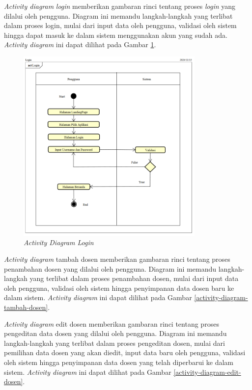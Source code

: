 \textit{Activity diagram} \textit{login} memberikan gambaran rinci tentang proses \textit{login} yang dilalui oleh pengguna. Diagram ini memandu langkah-langkah yang terlibat dalam proses login, mulai dari input data oleh pengguna, validasi oleh sistem hingga dapat masuk ke dalam sistem menggunakan akun yang sudah ada. \textit{Activity diagram} ini dapat dilihat pada Gambar \ref{activity-diagram-login}.
\begin{figure}
	\centering
	\includegraphics[width=0.82\textwidth]{konten/gambar/activity-diagram/login.png}
	\caption{\textit{Activity Diagram Login}}
	\label{activity-diagram-login}
\end{figure}

\textit{Activity diagram} tambah dosen memberikan gambaran rinci tentang proses penambahan dosen yang dilalui oleh pengguna. Diagram ini memandu langkah-langkah yang terlibat dalam proses penambahan dosen, mulai dari input data oleh pengguna, validasi oleh sistem hingga penyimpanan data dosen baru ke dalam sistem. \textit{Activity diagram} ini dapat dilihat pada Gambar \ref{activity-diagram-tambah-dosen}.



\textit{Activity diagram} edit dosen memberikan gambaran rinci tentang proses pengeditan data dosen yang dilalui oleh pengguna. Diagram ini memandu langkah-langkah yang terlibat dalam proses pengeditan dosen, mulai dari pemilihan data dosen yang akan diedit, input data baru oleh pengguna, validasi oleh sistem hingga penyimpanan data dosen yang telah diperbarui ke dalam sistem. \textit{Activity diagram} ini dapat dilihat pada Gambar \ref{activity-diagram-edit-dosen}.



